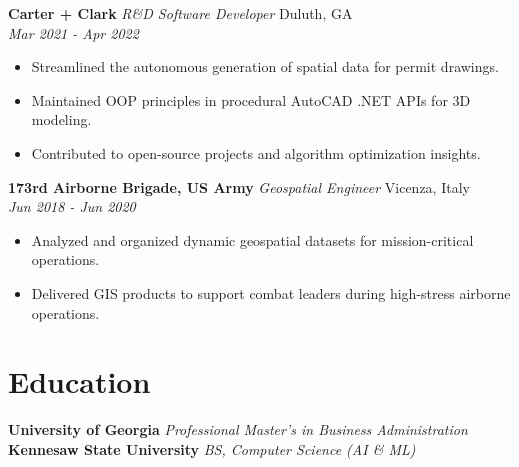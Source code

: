 \documentclass[10pt, letterpaper]{article}
\begin{document}
\vspace{0.2 cm}

\noindent\textbf{Carter + Clark} \hfill \textit{R\&D Software Developer} \hfill Duluth, GA\\
\textit{Mar 2021 - Apr 2022}
\begin{itemize}
    \item Streamlined the autonomous generation of spatial data for permit drawings.
    \item Maintained OOP principles in procedural AutoCAD .NET APIs for 3D modeling.
    \item Contributed to open-source projects and algorithm optimization insights.
\end{itemize}

\vspace{0.2 cm}

\noindent\textbf{173rd Airborne Brigade, US Army} \hfill \textit{Geospatial Engineer} \hfill Vicenza, Italy\\
\textit{Jun 2018 - Jun 2020}
\begin{itemize}
    \item Analyzed and organized dynamic geospatial datasets for mission-critical operations.
    \item Delivered GIS products to support combat leaders during high-stress airborne operations.
\end{itemize}


\vspace{0.3 cm}



\section*{Education}
\textbf{University of Georgia} \hfill \textit{Professional Master's in Business Administration} \\

\noindent\textbf{Kennesaw State University} \hfill \textit{BS, Computer Science (AI \& ML)} \\
\end{document}
